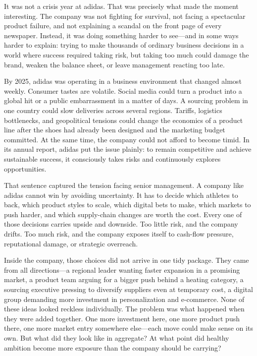 \documentclass[11pt,openany]{book}
\begin{document}
\begin{corporateexample}

It was not a crisis year at adidas. That was precisely what made the moment
interesting. The company was not fighting for survival, not facing a
spectacular product failure, and not explaining a scandal on the front page of
every newspaper. Instead, it was doing something harder to see---and in some
ways harder to explain: trying to make thousands of ordinary business decisions
in a world where success required taking risk, but taking too much could damage
the brand, weaken the balance sheet, or leave management reacting too late.

By 2025, adidas was operating in a business environment that changed almost
weekly. Consumer tastes are volatile. Social media could turn a product into a
global hit or a public embarrassment in a matter of days. A sourcing problem in
one country could slow deliveries across several regions. Tariffs, logistics
bottlenecks, and geopolitical tensions could change the economics of a product
line after the shoes had already been designed and the marketing budget
committed. At the same time, the company could not afford to become timid. In
its annual report, adidas put the issue plainly: to remain competitive and
achieve sustainable success, it consciously takes risks and continuously
explores opportunities.

That sentence captured the tension facing senior management. A company like
adidas cannot win by avoiding uncertainty. It has to decide which athletes to
back, which product styles to scale, which digital bets to make, which markets
to push harder, and which supply-chain changes are worth the cost. Every one
of those decisions carries upside and downside. Too little risk, and the
company drifts. Too much risk, and the company exposes itself to cash-flow
pressure, reputational damage, or strategic overreach.

Inside the company, those choices did not arrive in one tidy package. They came
from all directions---a regional leader wanting faster expansion in a promising
market, a product team arguing for a bigger push behind a heating category, a
sourcing executive pressing to diversify suppliers even at temporary cost, a
digital group demanding more investment in personalization and e-commerce. None
of these ideas looked reckless individually. The problem was what happened when
they were added together. One more investment here, one more product push
there, one more market entry somewhere else---each move could make sense on its
own. But what did they look like in aggregate? At what point did healthy
ambition become more exposure than the company should be carrying?


\end{corporateexample}
\end{document}
